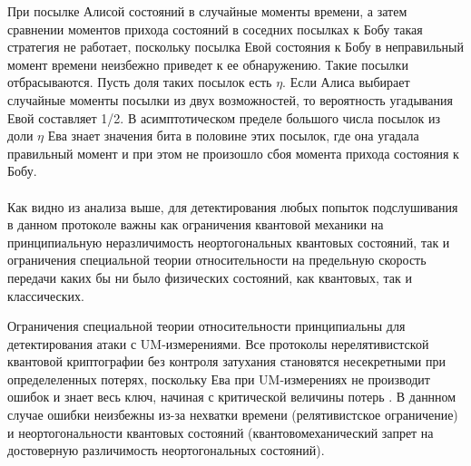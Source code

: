 При посылке Алисой состояний в случайные моменты времени, а затем сравнении моментов прихода состояний в соседних посылках к Бобу такая стратегия не работает, поскольку посылка Евой состояния к Бобу в неправильный момент времени неизбежно приведет к ее обнаружению.
Такие посылки отбрасываются. Пусть доля таких посылок есть $\eta$. Если Алиса выбирает случайные моменты посылки из двух возможностей, то вероятность угадывания Евой составляет 1/2. В асимптотическом пределе большого числа посылок из доли $\eta$ Ева знает значения бита в половине этих посылок, где она угадала правильный момент и при этом не произошло сбоя момента прихода состояния к Бобу.

\paragraph{}
Как видно из анализа выше, для детектирования любых попыток подслушивания в данном протоколе важны как ограничения квантовой механики на принципиальную неразличимость неортогональных квантовых состояний, так и ограничения специальной теории относительности на предельную скорость передачи каких бы ни было физических состояний, как квантовых, так и классических.

Ограничения специальной теории относительности принципиальны для детектирования атаки с UM-измерениями. Все протоколы нерелятивистской квантовой криптографии без контроля затухания становятся несекретными при определеленных потерях, поскольку Ева при UM-измерениях не производит ошибок и знает весь ключ, начиная с критической величины потерь \cite{scarani2009secpraquakeydis}. В даннном случае ошибки неизбежны из-за нехватки времени (релятивистское ограничение) и неортогональности квантовых состояний (квантовомеханический запрет на достоверную различимость неортогональных состояний).
\clearpage